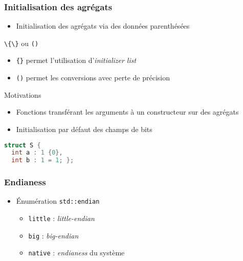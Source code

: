 \documentclass[C++.tex]{subfiles}
\begin{document}
\begin{frame}[fragile]
	\frametitle{Initialisation des agrégats}
	\begin{itemize}
		\item Initialisation des agrégats via des données parenthésées
	\end{itemize}

	\begin{block}{\lstinline|\{\}| ou \lstinline|()| }
		\begin{itemize}
			\item \lstinline|{}| permet l'utilisation d'\textit{initializer list}
			\item \lstinline|()| permet les conversions avec perte de précision
		\end{itemize}
	\end{block}

	\begin{block}{Motivations}
		\begin{itemize}
			\item Fonctions transférant les arguments à un constructeur sur des agrégats
		\end{itemize}
	\end{block}


	\begin{itemize}
		\item Initialisation par défaut des champs de bits
	\end{itemize}

	\begin{lstlisting}[language=C++]
struct S {
  int a : 1 {0},
  int b : 1 = 1; }; \end{lstlisting}

\end{frame}

\begin{frame}[fragile]
	\frametitle{Endianess}
	\begin{itemize}
		\item Énumération \lstinline|std::endian|
		\begin{itemize}
			\item \lstinline|little| : \textit{little-endian}
			\item \lstinline|big| : \textit{big-endian}
			\item \lstinline|native| : \textit{endianess} du système
		\end{itemize}
	\end{itemize}
\end{frame}
\end{document}
